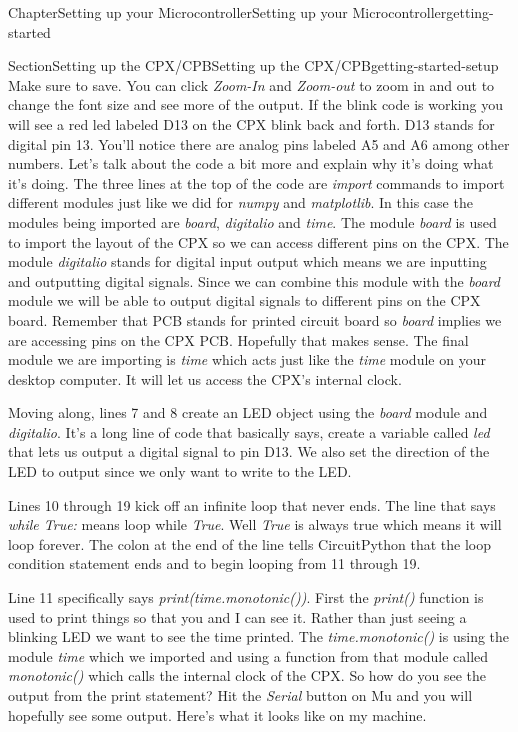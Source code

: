 \documentclass[oneside,10pt,]{book}
\numberwithin{equation}{section}
\begin{document}
\begin{chapterptx}{Chapter}{Setting up your Microcontroller}{}{Setting up your Microcontroller}{}{}{getting-started}
\begin{sectionptx}{Section}{Setting up the CPX\slash{}CPB}{}{Setting up the CPX\slash{}CPB}{}{}{getting-started-setup}
Make sure to save. You can click \emph{Zoom-In} and \emph{Zoom-out} to zoom in and out to change the font size and see more of the output. If the blink code is working you will see a red led labeled D13 on the CPX blink back and forth. D13 stands for digital pin 13. You'll notice there are analog pins labeled A5 and A6 among other numbers. Let's talk about the code a bit more and explain why it's doing what it's doing. The three lines at the top of the code are \emph{import} commands to import different modules just like we did for \emph{numpy} and \emph{matplotlib}. In this case the modules being imported are \emph{board}, \emph{digitalio} and \emph{time}. The module \emph{board} is used to import the layout of the CPX so we can access different pins on the CPX. The module \emph{digitalio} stands for digital input output which means we are inputting and outputting digital signals. Since we can combine this module with the \emph{board} module we will be able to output digital signals to different pins on the CPX board. Remember that PCB stands for printed circuit board so \emph{board} implies we are accessing pins on the CPX PCB. Hopefully that makes sense. The final module we are importing is \emph{time} which acts just like the \emph{time} module on your desktop computer. It will let us access the CPX's internal clock.%
\par
Moving along, lines 7 and 8 create an LED object using the \emph{board} module and \emph{digitalio}. It's a long line of code that basically says, create a variable called \emph{led} that lets us output a digital signal to pin D13. We also set the direction of the LED to output since we only want to write to the LED.%
\par
Lines 10 through 19 kick off an infinite loop that never ends. The line that says \emph{while True:} means loop while \emph{True}. Well \emph{True} is always true which means it will loop forever. The colon at the end of the line tells CircuitPython that the loop condition statement ends and to begin looping from 11 through 19.%
\par
Line 11 specifically says \emph{print(time.monotonic())}. First the \emph{print()} function is used to print things so that you and I can see it. Rather than just seeing a blinking LED we want to see the time printed. The \emph{time.monotonic()} is using the module \emph{time} which we imported and using a function from that module called \emph{monotonic()} which calls the internal clock of the CPX. So how do you see the output from the print statement? Hit the \emph{Serial} button on Mu and you will hopefully see some output. Here's what it looks like on my machine.%

\end{sectionptx}
\end{chapterptx}
\end{document}

